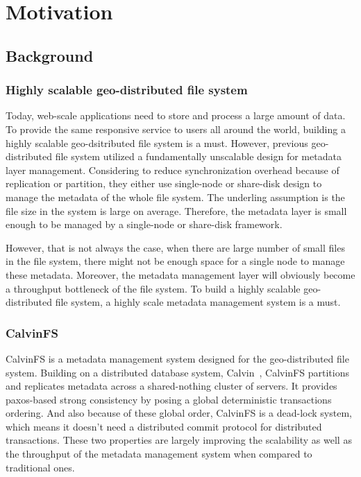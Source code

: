 \section{Motivation}

\subsection{Background}
\subsubsection{Highly scalable geo-distributed file system}
Today, web-scale applications need to store and process a large amount of data. To provide the same responsive service to users all around the world, building a highly scalable geo-dsitributed file system is a must. However, previous geo-distributed file system utilized a fundamentally unscalable design for metadata layer management. Considering to reduce synchronization overhead because of replication or partition, they either use single-node or share-disk design to manage the metadata of the whole file system. The underling assumption is the file size in the system is large on average. Therefore, the metadata layer is small enough to be managed by a single-node or share-disk framework. 

However, that is not always the case, when there are large number of small files in the file system, there might not be enough space for a single node to manage these metadata. Moreover, the metadata management layer will obviously become a throughput bottleneck of the file system. To build a highly scalable geo-distributed file system, a highly scale metadata management system is a must.

\subsubsection{CalvinFS}
CalvinFS \cite{thomson2015calvinfs} is a metadata management system designed for the geo-distributed file system. Building on a distributed database system, Calvin~\cite{calvin}, CalvinFS partitions and replicates metadata across a shared-nothing cluster of servers. It provides paxos-based strong consistency by posing a global deterministic transactions ordering. And also because of these global order, CalvinFS is a dead-lock system, which means it doesn't need a distributed commit protocol for distributed transactions. These two properties are largely improving the scalability as well as the throughput of the metadata management system when compared to traditional ones.


